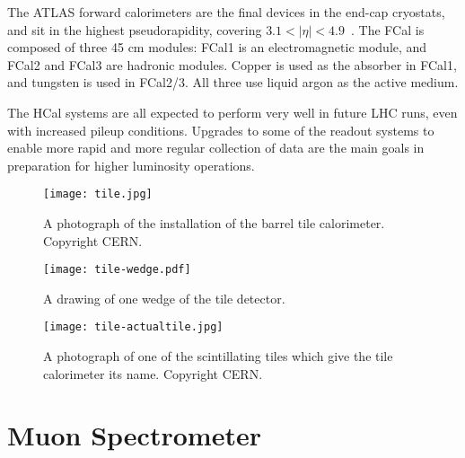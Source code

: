 The ATLAS forward calorimeters are the final devices in the end-cap cryostats, and sit in the highest pseudorapidity, covering $3.1 < |\eta| < 4.9$~\cite{ATLASPaper}. The FCal is composed of three 45 cm modules: FCal1 is an electromagnetic module, and FCal2 and FCal3 are hadronic modules. Copper is used as the absorber in FCal1, and tungsten is used in FCal2/3. All three use liquid argon as the active medium.

The HCal systems are all expected to perform very well in future LHC runs, even with increased pileup conditions. Upgrades to some of the readout systems to enable more rapid and more regular collection of data are the main goals in preparation for higher luminosity operations.


\begin{figure}
\centering
\texttt{[image: tile.jpg]}
\caption{A photograph of the installation of the barrel tile calorimeter. Copyright CERN.}
\label{fig:detector:barrel-tile}
\end{figure}



\begin{figure}
\centering
\texttt{[image: tile-wedge.pdf]}
\caption{A drawing of one wedge of the tile detector.}
\label{fig:detector:tile-wedge}
\end{figure}



\begin{figure}
\centering
\texttt{[image: tile-actualtile.jpg]}
\caption{A photograph of one of the scintillating tiles which give the tile calorimeter its name. Copyright CERN.}
\label{fig:detector:actualtile}
\end{figure}





\section{Muon Spectrometer}

